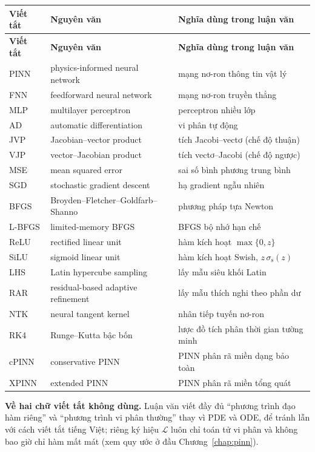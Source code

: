 \begin{longtable}{@{}l p{5.3cm} p{6.0cm}@{}}
\toprule
\textbf{Viết tắt} & \textbf{Nguyên văn} & \textbf{Nghĩa dùng trong luận văn} \\
\midrule
\endfirsthead
\toprule
\textbf{Viết tắt} & \textbf{Nguyên văn} & \textbf{Nghĩa dùng trong luận văn} \\
\midrule
\endhead
\bottomrule
\endfoot
PINN & physics-informed neural network & mạng nơ-ron thông tin vật lý \\
FNN & feedforward neural network & mạng nơ-ron truyền thẳng \\
MLP & multilayer perceptron & perceptron nhiều lớp \\
AD & automatic differentiation & vi phân tự động \\
JVP & Jacobian--vector product & tích Jacobi--vectơ (chế độ thuận) \\
VJP & vector--Jacobian product & tích vectơ--Jacobi (chế độ ngược) \\
MSE & mean squared error & sai số bình phương trung bình \\
SGD & stochastic gradient descent & hạ gradient ngẫu nhiên \\
BFGS & Broyden--Fletcher--Goldfarb--Shanno & phương pháp tựa Newton \\
L-BFGS & limited-memory BFGS & BFGS bộ nhớ hạn chế \\
ReLU & rectified linear unit & hàm kích hoạt $\max\{0,z\}$ \\
SiLU & sigmoid linear unit & hàm kích hoạt Swish, $z\,\sigma_{\mathrm{s}}(z)$ \\
LHS & Latin hypercube sampling & lấy mẫu siêu khối Latin \\
RAR & residual-based adaptive refinement & lấy mẫu thích nghi theo phần dư \\
NTK & neural tangent kernel & nhân tiếp tuyến nơ-ron \\
RK4 & Runge--Kutta bậc bốn & lược đồ tích phân thời gian tường minh \\
cPINN & conservative PINN & PINN phân rã miền dạng bảo toàn \\
XPINN & extended PINN & PINN phân rã miền tổng quát \\
\bottomrule
\end{longtable}

\begin{center}
\begin{minipage}{0.92\textwidth}
\small
\textbf{Về hai chữ viết tắt không dùng.} Luận văn viết đầy đủ ``phương trình đạo
hàm riêng'' và ``phương trình vi phân thường'' thay vì PDE và ODE, để tránh lẫn
với cách viết tắt tiếng Việt; riêng ký hiệu $\mathcal{L}$ luôn chỉ toán tử vi
phân và không bao giờ chỉ hàm mất mát (xem quy ước ở đầu
Chương~\ref{chap:pinn}).
\end{minipage}
\end{center}
